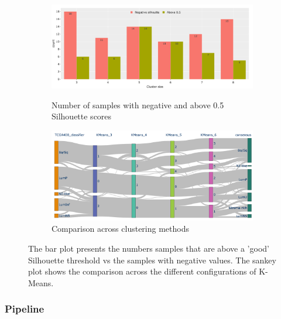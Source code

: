 \begin{figure}[H]
    \centering
    \begin{subfigure}[H]{0.8\textwidth}
        \includegraphics[width=\textwidth, keepaspectratio]{Sections/ClusteringAnalysis/Resources/cs_top3/sill_distrib/sill_neg_above_th.png}
        \label{fig:cs:sill_neg_above_th}
        \caption{Number of samples with negative and above 0.5 Silhouette scores}
    \end{subfigure}
    \centering
     \begin{subfigure}[!t]{0.8\textwidth}
        \includegraphics[width=\textwidth, keepaspectratio]{Sections/ClusteringAnalysis/Resources/cs_top3/sill_distrib/sky_kMeans.png}
        \caption{Comparison across clustering methods}
    \end{subfigure}
    \centering
    \caption{The bar plot presents the numbers samples that are above a 'good' Silhouette threshold vs the samples with negative values. The sankey plot shows the comparison across the different configurations of K-Means.}
    \label{fig:cs:sankey_comp}
\end{figure}




\subsubsection{Pipeline}

